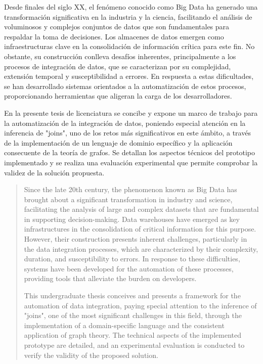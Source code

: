 \begin{resumen}
Desde finales del siglo XX, el fenómeno conocido como Big Data ha generado una transformación significativa en la industria y la ciencia, facilitando el 
análisis de voluminosos y complejos conjuntos de datos que son fundamentales para respaldar la toma de 
decisiones. Los almacenes de datos emergen como infraestructuras clave en la consolidación de información 
crítica para este fin. No obstante, su construcción conlleva desafíos inherentes, principalmente a los 
procesos de integración de datos, que se caracterizan por su complejidad, extensión temporal y susceptibilidad 
a errores. En respuesta a estas dificultades, se han desarrollado sistemas orientados a la automatización de 
estos procesos, proporcionando herramientas que aligeran la carga de los desarrolladores.

En la presente tesis de licenciatura se concibe y expone un marco de trabajo para la automatización de la 
integración de datos, poniendo 
especial atención en la inferencia de "joins", uno de los retos más significativos en este ámbito, a través de la 
implementación de un lenguaje de dominio específico y la aplicación consecuente de la teoría de grafos. Se detallan 
los aspectos 
técnicos del prototipo implementado y se realiza una evaluación experimental que permite comprobar la validez de la 
solución propuesta.
\end{resumen}

\begin{abstract}
    Since the late 20th century, the phenomenon known as Big Data has brought about a significant transformation 
    in industry and science, facilitating the analysis of large and complex datasets that are fundamental in 
    supporting decision-making. Data warehouses have emerged as key infrastructures in the consolidation of 
    critical information for this purpose. However, their construction presents inherent challenges, particularly 
    in the data integration processes, which are characterized by their complexity, duration, and susceptibility 
    to errors. In response to these difficulties, systems have been developed for the automation of these processes, 
    providing tools that alleviate the burden on developers.

    This undergraduate thesis conceives and presents a framework for the automation of data integration, paying 
    special attention to the inference of "joins", one of the most significant challenges in this field, 
    through the implementation of a domain-specific language and the consistent application of graph theory. 
    The technical aspects of the implemented prototype are detailed, and an experimental evaluation is conducted 
    to verify the validity of the proposed solution.
\end{abstract}